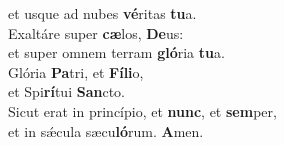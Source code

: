 \oddverse et usque ad nubes \textbf{vé}ritas \textbf{tu}a.\\
\evenverse Exaltáre super \textbf{cæ}los, \textbf{De}us:~\*\\
\evenverse et super omnem terram \textbf{gló}ria \textbf{tu}a.\\
\oddverse Glória \textbf{Pa}tri, et \textbf{Fí}\textbf{li}o,~\*\\
\oddverse et Spi\textbf{rí}tui \textbf{San}cto.\\
\evenverse Sicut erat in princípio, et \textbf{nunc}, et \textbf{sem}per,~\*\\
\evenverse et in sǽcula sæcu\textbf{ló}rum. \textbf{A}men.\\
